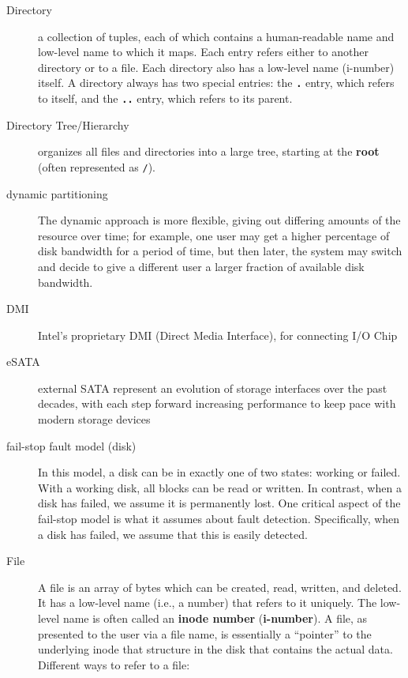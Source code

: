\begin{description}
\item[Directory] a collection of tuples, each of which contains a human-readable name and low-level name to which it maps. Each entry refers either to another directory or to a file. Each directory also has a low-level name (i-number) itself. A directory always has two special entries: the \textbf{\texttt{.}} entry, which refers to itself, and the \textbf{\texttt{..}} entry, which refers to its parent.

\item[Directory Tree/Hierarchy] organizes all files and directories into a large tree, starting at the \textbf{root} (often represented as \texttt{/}).

\item[dynamic partitioning] The dynamic approach is more flexible, giving out differing amounts of the resource over time; for example, one user may get a higher percentage of disk bandwidth for a period of time, but then later, the system may switch and decide to give a different user a larger fraction of available disk bandwidth.

\item[DMI]  Intel’s proprietary DMI (Direct Media Interface), for connecting I/O Chip

\item[eSATA] external SATA represent an evolution of storage interfaces over the past decades, with each step forward increasing performance to keep pace with modern storage devices

\item[fail-stop fault model (disk)]  In this model, a disk can be in exactly one of two states: working or failed. With a working disk, all blocks can be read or written. In contrast, when a disk has failed, we assume it is permanently lost. One critical aspect of the fail-stop model is what it assumes about fault detection. Specifically, when a disk has failed, we assume that this is easily detected.

\item[File] A file is an array of bytes which can be created, read, written, and deleted. It has a low-level name (i.e., a number) that refers to it uniquely. The low-level name is often called an \textbf{inode number} (\textbf{i-number}).  A file, as presented to the user via a file name, is essentially a “pointer” to the underlying inode that structure in the disk that contains the actual data. Different ways to refer to a file:


\end{description}
